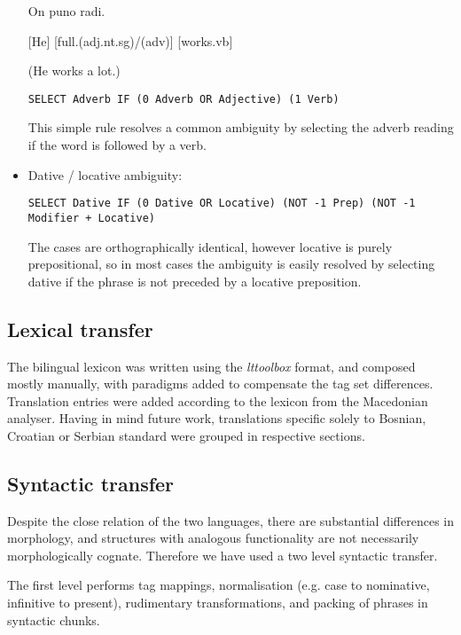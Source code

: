 \documentclass{book}
\begin{document}
\begin{itemize}
{On puno radi.

[He] [full{\sc.(adj.nt.sg)/(adv)}] [works{\sc.vb}]

(He works a lot.)
}

\texttt{SELECT Adverb IF (0 Adverb OR Adjective) (1 Verb)}

This simple rule resolves a common ambiguity by selecting the adverb reading if the word is followed by a verb.

\item Dative / locative ambiguity:


\texttt{SELECT Dative IF (0 Dative OR Locative) (NOT -1 Prep) (NOT -1 Modifier + Locative)}

The cases are orthographically identical, however locative
is purely prepositional, so in most cases the ambiguity is easily
resolved by selecting dative if the phrase
is not preceded by a locative preposition.

\end{itemize}

\subsection*{Lexical transfer}
The bilingual lexicon was written using the \emph{lttoolbox} format, and composed mostly 
manually, with paradigms added to compensate the tag set differences.
Translation entries were added according to the lexicon from 
the Macedonian analyser. Having in mind future work, translations specific solely 
to Bosnian, Croatian or Serbian standard were grouped in respective sections.

\subsection*{Syntactic transfer}
Despite the close relation of the two languages, there are substantial 
differences in morphology, and structures with analogous functionality 
are not necessarily morphologically cognate. Therefore we have used 
a two level syntactic transfer. 

The first level performs tag mappings, normalisation (e.g. 
case to nominative, infinitive to present), 
rudimentary transformations, and packing of phrases in syntactic chunks. 
\end{document}
